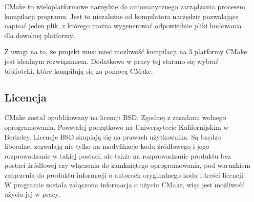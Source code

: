 \par
CMake to wieloplatformowe narzędzie do automatycznego zarządzania procesem kompilacji programu.
Jest to niezależne od kompilatora narzędzie pozwalające napisać jeden plik, z którego można wygenerować odpowiednie pliki budowania dla dowolnej platformy.
\par
Z uwagi na to, że projekt musi mieć możliwość kompilacji na 3 platformy CMake jest idealnym rozwiązaniem.
Dodatkowo w pracy tej starano się wybrać biblioteki, które kompilują się za pomocą CMake.

\subsection*{Licencja}

CMake został opublikowany na licencji BSD.
Zgodnej z zasadami wolnego oprogramowania.
Powstałej początkowo na Uniwersytecie Kalifornijskim w Berkeley.
Licencje BSD skupiają się na prawach użytkownika.
Są bardzo liberalne, zezwalają nie tylko na modyfikacje kodu źródłowego i jego rozprowadzanie w takiej postaci, ale także na rozprowadzanie produktu bez postaci źródłowej czy włączenia do zamkniętego oprogramowania, pod warunkiem załączenia do produktu informacji o autorach oryginalnego kodu i treści licencji.
W programie została załączona informacja o użyciu CMake, więc jest możliwość użycia jej w pracy.